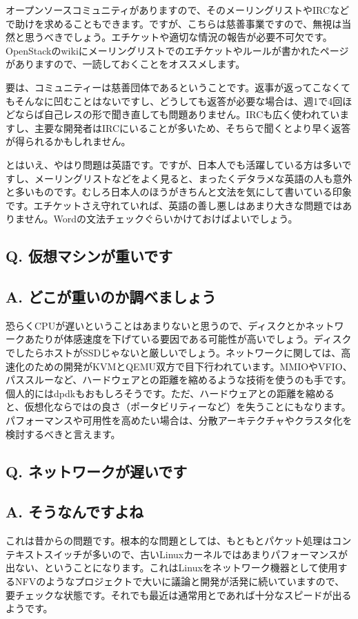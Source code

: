 \documentclass[9pt,b5paper,tombo,openany]{jsbook}
\begin{document}
オープンソースコミュニティがありますので、そのメーリングリストやIRCなどで助けを求めることもできます。ですが、こちらは慈善事業ですので、無視は当然と思うべきでしょう。エチケットや適切な情況の報告が必要不可欠です。OpenStackのwikiにメーリングリストでのエチケットやルールが書かれたページがありますので、一読しておくことをオススメします。

要は、コミュニティーは慈善団体であるということです。返事が返ってこなくてもそんなに凹むことはないですし、どうしても返答が必要な場合は、週1で4回ほどならば自己レスの形で聞き直しても問題ありません。IRCも広く使われていますし、主要な開発者はIRCにいることが多いため、そちらで聞くとより早く返答が得られるかもしれません。

とはいえ、やはり問題は英語です。ですが、日本人でも活躍している方は多いですし、メーリングリストなどをよく見ると、まったくデタラメな英語の人も意外と多いものです。むしろ日本人のほうがきちんと文法を気にして書いている印象です。エチケットさえ守れていれば、英語の善し悪しはあまり大きな問題ではありません。Wordの文法チェックぐらいかけておけばよいでしょう。

\subsection*{{\bfseries Q.} 仮想マシンが重いです}
\subsection*{{\bfseries A.} どこが重いのか調べましょう}
恐らくCPUが遅いということはあまりないと思うので、ディスクとかネットワークあたりが体感速度を下げている要因である可能性が高いでしょう。ディスクでしたらホストがSSDじゃないと厳しいでしょう。ネットワークに関しては、高速化のための開発がKVMとQEMU双方で目下行われています。MMIOやVFIO、パススルーなど、ハードウェアとの距離を縮めるような技術を使うのも手です。個人的にはdpdkもおもしろそうです。ただ、ハードウェアとの距離を縮めると、仮想化ならではの良さ（ポータビリティーなど）を失うことにもなります。パフォーマンスや可用性を高めたい場合は、分散アーキテクチャやクラスタ化を検討するべきと言えます。

\subsection*{{\bfseries Q.} ネットワークが遅いです}
\subsection*{{\bfseries A.} そうなんですよね}
これは昔からの問題です。根本的な問題としては、もともとパケット処理はコンテキストスイッチが多いので、古いLinuxカーネルではあまりパフォーマンスが出ない、ということになります。これはLinuxをネットワーク機器として使用するNFVのようなプロジェクトで大いに議論と開発が活発に続いていますので、要チェックな状態です。それでも最近は通常用とであれば十分なスピードが出るようです。
\end{document}

